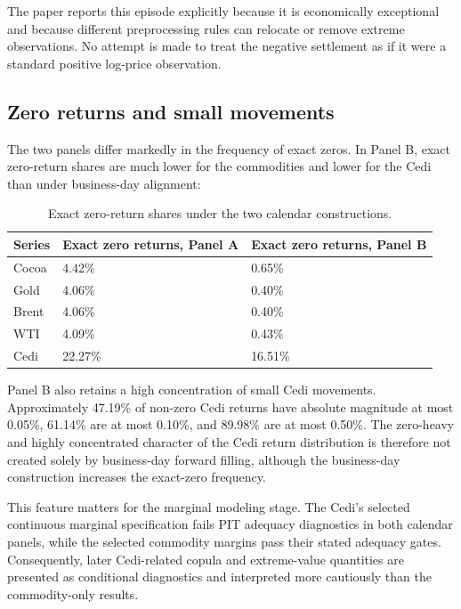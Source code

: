 The paper reports this episode explicitly because it is economically exceptional and because different preprocessing rules can relocate or remove extreme observations. No attempt is made to treat the negative settlement as if it were a standard positive log-price observation.

\subsection{Zero returns and small movements}

The two panels differ markedly in the frequency of exact zeros. In Panel B, exact zero-return shares are much lower for the commodities and lower for the Cedi than under business-day alignment:

\begin{table}[htbp]
\centering
\caption{Exact zero-return shares under the two calendar constructions.}
\label{tab:zero-returns}
\small
\begin{tabularx}{\textwidth}{lXX}
\toprule
\textbf{Series} & \textbf{Exact zero returns, Panel A} & \textbf{Exact zero returns, Panel B} \\
\midrule
Cocoa & 4.42\% & 0.65\% \\
Gold & 4.06\% & 0.40\% \\
Brent & 4.06\% & 0.40\% \\
WTI & 4.09\% & 0.43\% \\
Cedi & 22.27\% & 16.51\% \\
\bottomrule
\end{tabularx}
\end{table}

Panel B also retains a high concentration of small Cedi movements. Approximately 47.19\% of non-zero Cedi returns have absolute magnitude at most 0.05\%, 61.14\% are at most 0.10\%, and 89.98\% are at most 0.50\%. The zero-heavy and highly concentrated character of the Cedi return distribution is therefore not created solely by business-day forward filling, although the business-day construction increases the exact-zero frequency.

This feature matters for the marginal modeling stage. The Cedi's selected continuous marginal specification fails PIT adequacy diagnostics in both calendar panels, while the selected commodity margins pass their stated adequacy gates. Consequently, later Cedi-related copula and extreme-value quantities are presented as conditional diagnostics and interpreted more cautiously than the commodity-only results.


